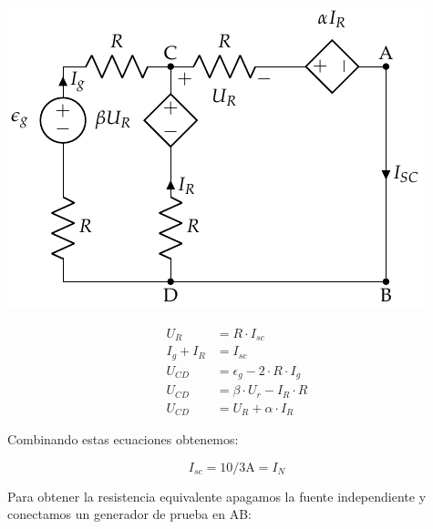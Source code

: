 \documentclass[12pt]{article}
\begin{document}
\begin{minipage}{0.5\linewidth}
  \includegraphics[width=.9\linewidth]{../figs/norton_corto.pdf}
\end{minipage}
\begin{minipage}{0.5\linewidth}
  \begin{align*}
    U_R &= R \cdot I_{sc}\\
    I_g+ I_R &= I_{sc}\\
    U_{CD} &= \epsilon_g - 2 \cdot R \cdot I_g\\
    U_{CD} &= \beta \cdot U_r - I_R \cdot R\\
    U_{CD} &= U_R + \alpha \cdot I_R
  \end{align*}
\end{minipage}

Combinando estas ecuaciones obtenemos:

\begin{equation*}
  I_{sc} = 10/3\si{\ampere} = I_N
\end{equation*}

Para obtener la resistencia equivalente apagamos la fuente independiente y conectamos un generador de prueba en AB:
\end{document}
